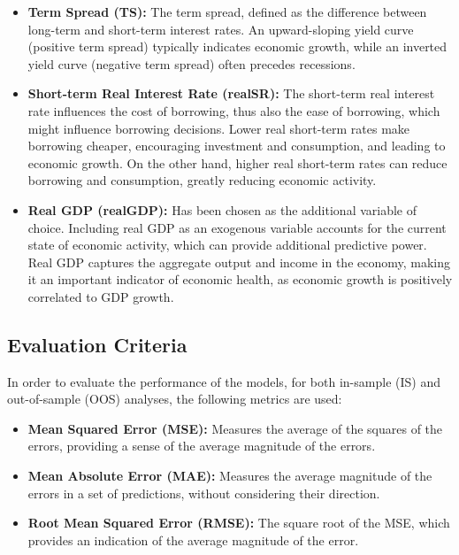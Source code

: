 \documentclass[12pt]{article}
\begin{document}
\begin{itemize}
    \item \textbf{Term Spread (TS):} The term spread, defined as the difference between long-term and short-term interest rates. An upward-sloping yield curve (positive term spread) typically indicates economic growth, while an inverted yield curve (negative term spread) often precedes recessions.
    
    \item \textbf{Short-term Real Interest Rate (realSR):} The short-term real interest rate influences the cost of borrowing, thus also the ease of borrowing, which might influence borrowing decisions. Lower real short-term rates make borrowing cheaper, encouraging investment and consumption, and leading to economic growth. On the other hand, higher real short-term rates can reduce borrowing and consumption, greatly reducing economic activity.
    
    \item \textbf{Real GDP (realGDP):} Has been chosen as the additional variable of choice. Including real GDP as an exogenous variable accounts for the current state of economic activity, which can provide additional predictive power. Real GDP captures the aggregate output and income in the economy, making it an important indicator of economic health, as economic growth is positively correlated to GDP growth.
    
\end{itemize}

\subsection{Evaluation Criteria}

In order to evaluate the performance of the models, for both in-sample (IS) and out-of-sample (OOS) analyses, the following metrics are used:

\begin{itemize}
    \item \textbf{Mean Squared Error (MSE):} Measures the average of the squares of the errors, providing a sense of the average magnitude of the errors.
    \item \textbf{Mean Absolute Error (MAE):} Measures the average magnitude of the errors in a set of predictions, without considering their direction.
    \item \textbf{Root Mean Squared Error (RMSE):} The square root of the MSE, which provides an indication of the average magnitude of the error.
\end{itemize}
\end{document}
